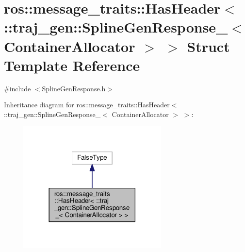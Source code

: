 \hypertarget{structros_1_1message__traits_1_1_has_header_3_01_1_1traj__gen_1_1_spline_gen_response___3_01_container_allocator_01_4_01_4}{}\section{ros\+:\+:message\+\_\+traits\+:\+:Has\+Header$<$ \+:\+:traj\+\_\+gen\+:\+:Spline\+Gen\+Response\+\_\+$<$ Container\+Allocator $>$ $>$ Struct Template Reference}
\label{structros_1_1message__traits_1_1_has_header_3_01_1_1traj__gen_1_1_spline_gen_response___3_01_container_allocator_01_4_01_4}


{\ttfamily \#include $<$Spline\+Gen\+Response.\+h$>$}



Inheritance diagram for ros\+:\+:message\+\_\+traits\+:\+:Has\+Header$<$ \+:\+:traj\+\_\+gen\+:\+:Spline\+Gen\+Response\+\_\+$<$ Container\+Allocator $>$ $>$\+:
\nopagebreak
\begin{figure}[H]
\begin{center}
\leavevmode
\includegraphics[width=213pt]{structros_1_1message__traits_1_1_has_header_3_01_1_1traj__gen_1_1_spline_gen_response___3_01_con5c49c447d1ccc9a13e503f523614e09c}
\end{center}
\end{figure}


